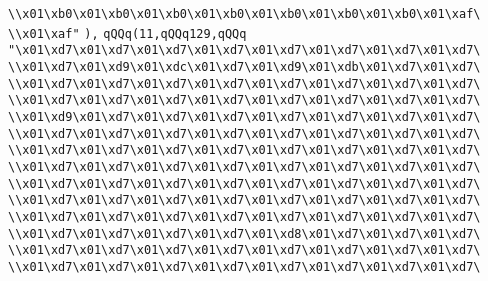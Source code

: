 \verb|\\x01\xb0\x01\xb0\x01\xb0\x01\xb0\x01\xb0\x01\xb0\x01\xb0\x01\xaf\|\newline
\verb|\\x01\xaf"|\newline
\verb|),|\newline
\verb|qQQq(11,qQQq129,qQQq|\newline
\verb|"\x01\xd7\x01\xd7\x01\xd7\x01\xd7\x01\xd7\x01\xd7\x01\xd7\x01\xd7\|\newline
\verb|\\x01\xd7\x01\xd9\x01\xdc\x01\xd7\x01\xd9\x01\xdb\x01\xd7\x01\xd7\|\newline
\verb|\\x01\xd7\x01\xd7\x01\xd7\x01\xd7\x01\xd7\x01\xd7\x01\xd7\x01\xd7\|\newline
\verb|\\x01\xd7\x01\xd7\x01\xd7\x01\xd7\x01\xd7\x01\xd7\x01\xd7\x01\xd7\|\newline
\verb|\\x01\xd9\x01\xd7\x01\xd7\x01\xd7\x01\xd7\x01\xd7\x01\xd7\x01\xd7\|\newline
\verb|\\x01\xd7\x01\xd7\x01\xd7\x01\xd7\x01\xd7\x01\xd7\x01\xd7\x01\xd7\|\newline
\verb|\\x01\xd7\x01\xd7\x01\xd7\x01\xd7\x01\xd7\x01\xd7\x01\xd7\x01\xd7\|\newline
\verb|\\x01\xd7\x01\xd7\x01\xd7\x01\xd7\x01\xd7\x01\xd7\x01\xd7\x01\xd7\|\newline
\verb|\\x01\xd7\x01\xd7\x01\xd7\x01\xd7\x01\xd7\x01\xd7\x01\xd7\x01\xd7\|\newline
\verb|\\x01\xd7\x01\xd7\x01\xd7\x01\xd7\x01\xd7\x01\xd7\x01\xd7\x01\xd7\|\newline
\verb|\\x01\xd7\x01\xd7\x01\xd7\x01\xd7\x01\xd7\x01\xd7\x01\xd7\x01\xd7\|\newline
\verb|\\x01\xd7\x01\xd7\x01\xd7\x01\xd7\x01\xd8\x01\xd7\x01\xd7\x01\xd7\|\newline
\verb|\\x01\xd7\x01\xd7\x01\xd7\x01\xd7\x01\xd7\x01\xd7\x01\xd7\x01\xd7\|\newline
\verb|\\x01\xd7\x01\xd7\x01\xd7\x01\xd7\x01\xd7\x01\xd7\x01\xd7\x01\xd7\|\newline
